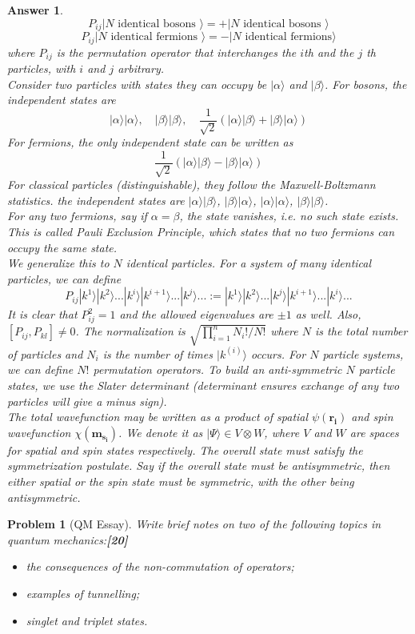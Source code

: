 \documentclass[a4paper]{article}
\newtheorem{ans}{Answer}[subsection]
\theoremstyle{new}
\newtheorem{qns}{Problem}[subsection]
\begin{document}
\begin{ans}
$$P_{ij}|N\text{ identical bosons }\rangle=+|N\text{ identical bosons }\rangle$$
$$P_{ij}|N\text{ identical fermions }\rangle=-|N\text{ identical fermions}\rangle$$
where $P_{ij}$ is the permutation operator that interchanges the $i$th and the $j$ th particles, with $i$ and $j$ arbitrary.\\[5pt]
Consider two particles with states they can occupy be $|\alpha\rangle$ and $|\beta\rangle$. For bosons, the independent states are
$$|\alpha\rangle|\alpha\rangle,\quad|\beta\rangle|\beta\rangle,\quad\frac{1}{\sqrt{2}}(|\alpha\rangle|\beta\rangle+|\beta\rangle|\alpha\rangle)$$
For fermions, the only independent state can be written as
$$\frac{1}{\sqrt{2}}(|\alpha\rangle|\beta\rangle-|\beta\rangle|\alpha\rangle)$$
For classical particles (distinguishable), they follow the Maxwell-Boltzmann statistics. the independent states are $|\alpha\rangle|\beta\rangle$, $|\beta\rangle|\alpha\rangle$, $|\alpha\rangle|\alpha\rangle$, $|\beta\rangle|\beta\rangle$.\\[5pt]
For any two fermions, say if $\alpha=\beta$, the state vanishes, i.e. no such state exists. This is called Pauli Exclusion Principle, which states that no two fermions can occupy the same state.\\[5pt]
We generalize this to $N$ identical particles. For a system of many identical particles, we can define
$$P_{ij}|k^1\rangle|k^2\rangle...|k^i\rangle|k^{i+1}\rangle...|k^j\rangle...:=|k^1\rangle|k^2\rangle...|k^j\rangle|k^{i+1}\rangle...|k^i\rangle...$$
It is clear that $P_{ij}^2=1$ and the allowed eigenvalues are $\pm 1$ as well. Also, $[P_{ij},P_{kl}]\neq 0$. The normalization is $\sqrt{\prod_{i=1}^nN_i!/N!}$ where $N$ is the total number of particles and $N_i$ is the number of times $|k^{(i)}\rangle$ occurs. For $N$ particle systems, we can define $N!$ permutation operators. To build an anti-symmetric $N$ particle states, we use the Slater determinant (determinant ensures exchange of any two particles will give a minus sign).\\[5pt]
The total wavefunction may be written as a product of spatial $\psi(\mathbf{r_i})$ and spin wavefunction $\chi(\mathbf{m_{s_i}})$. We denote it as $|\Psi\rangle\in V\otimes W$, where $V$ and $W$ are spaces for spatial and spin states respectively. The overall state must satisfy the symmetrization postulate. Say if the overall state must be antisymmetric, then either spatial or the spin state must be symmetric, with the other being antisymmetric.
\end{ans}
\newpage
\begin{qns}[QM Essay]
Write brief notes on two of the following topics in quantum mechanics:\hfill\textbf{[20]}
\begin{itemize}
    \item the consequences of the non-commutation of operators;
    \item examples of tunnelling;
    \item singlet and triplet states.
\end{itemize}
\end{qns}
\end{document}

